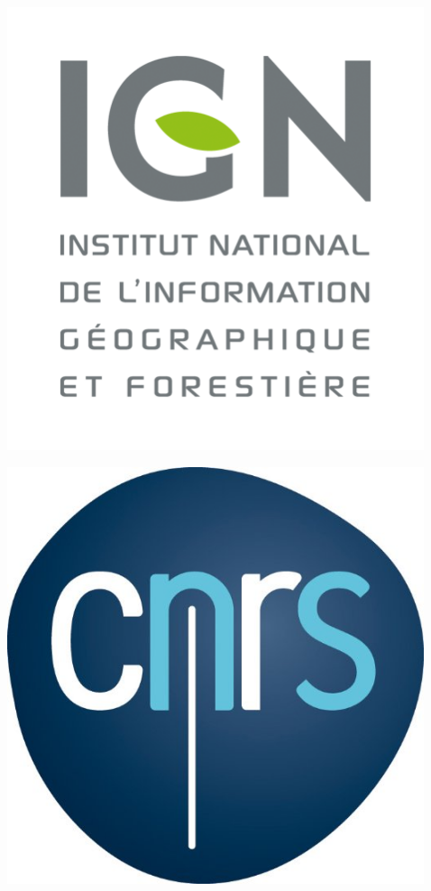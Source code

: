 \documentclass[final]{beamer}
\newlength{\sepwidth}
\newlength{\colwidth}
\newcommand{\separatorcolumn}{\begin{column}{\sepwidth}\end{column}}
\begin{document}
\begin{frame}[t]
\begin{columns}[t]
\begin{column}{\colwidth}
\end{column}

\separatorcolumn

\begin{column}{\colwidth}  

	\vspace{2cm}
	
		\begin{minipage}[t]{0.20\linewidth}
			\centering
			\includegraphics[width=\linewidth]{images/logos/ign_logo} 
		\end{minipage}\hfill
		\begin{minipage}[t]{0.19\linewidth}
			\centering
			\includegraphics[width=\linewidth]{images/logos/cnrs} 

\end{minipage}
\end{column}
\end{columns}
\end{frame}
\end{document}
